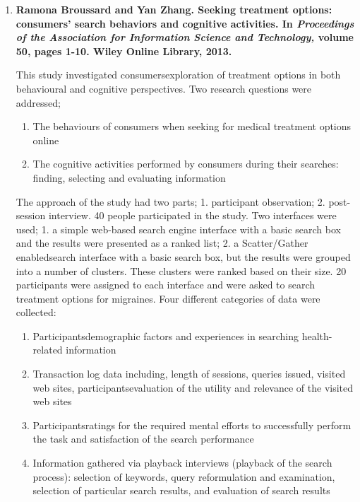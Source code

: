 \documentclass[]{article}
\begin{document}
\begin{enumerate}
\item {\textbf{Ramona Broussard and Yan Zhang. Seeking treatment options: consumers’ search behaviors and cognitive activities. In \textit{Proceedings of the Association for Information Science and Technology,} volume 50, pages 1-10. Wiley Online Library, 2013.
}} 

This study investigated consumers\textquotesingle exploration of treatment options in both behavioural and cognitive perspectives. Two research questions were addressed;

\begin{enumerate}
		\item The behaviours of consumers when seeking for medical treatment options online
		
		\item The cognitive activities performed by consumers during their searches: finding, selecting and evaluating information  
\end{enumerate}

The approach of the study had two parts; 1. participant observation; 2. post-session interview. 40 people participated in the study. Two interfaces were used; 1. a simple web-based search engine interface with a basic search box and the results were presented as a ranked list; 2. a \textquotesingle Scatter/Gather enabled\textquotesingle  search interface with a basic search box, but the results were grouped into a number of clusters. These clusters were ranked based on their size. 20 participants were assigned to each interface and were asked to search treatment options for migraines. Four different categories of data were collected:

\begin{enumerate}
		\item Participants\textquotesingle demographic factors and experiences in searching health-related information
		
		\item Transaction log data including, length of sessions, queries issued, visited web sites, participants\textquotesingle evaluation of the utility and relevance of the visited web sites
		
		\item Participants\textquotesingle ratings for the required mental efforts to successfully perform the task and satisfaction of the search performance 
		
		\item Information gathered via playback interviews (playback of the search process): selection of keywords, query reformulation and examination, selection of particular search results, and evaluation of search results   
\end{enumerate} 


\end{enumerate}
\end{document}
